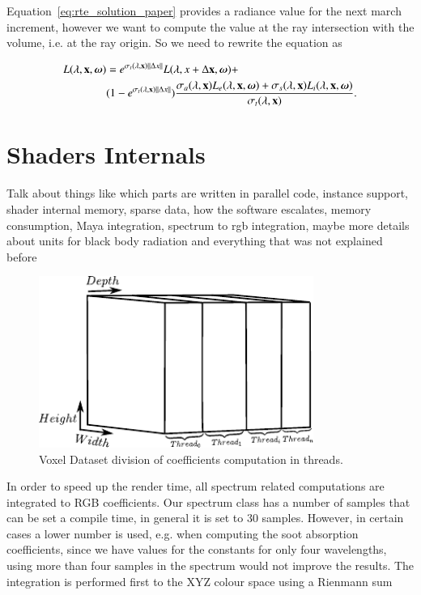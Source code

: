 Equation~\ref{eq:rte_solution_paper} provides a radiance value for the next march increment, however we want to compute the value at the ray intersection with the volume, i.e. at the ray origin.
So we need to rewrite the equation as

\begin{equation}
\label{eq:rte_solution_paper}
\begin{split}
L(\lambda, \mathbf{x}, \boldsymbol{\omega}) &= e^{\sigma_t(\lambda, \mathbf{x}) \left \| \Delta x \right \|} L(\lambda, x + \Delta\mathbf{x}, \boldsymbol{\omega}) +  \\
& (1 - e^{\sigma_t(\lambda, \mathbf{x}) \left \| \Delta x \right \|} ) \frac{\sigma_a(\lambda, \mathbf{x}) L_e(\lambda, \mathbf{x}, \boldsymbol{\omega}) + \sigma_s(\lambda, \mathbf{x}) L_i(\lambda, \mathbf{x}, \boldsymbol{\omega})}{\sigma_t(\lambda, \mathbf{x})}.
\end{split}
\end{equation}

\section{Shaders Internals}
\label{sec:shaders_internals}

Talk about things like which parts are written in parallel code, instance support, shader internal memory, sparse data, how the software escalates, memory consumption, Maya integration, spectrum to rgb integration, maybe more details about units for black body radiation and everything that was not explained before

\begin{figure}[htbp!]
\centering
\includegraphics[width=0.8\textwidth]{img/voxel_thread_division}
	\caption{Voxel Dataset division of coefficients computation in threads.}
	\label{fig:voxel_dataset_threaded}
\end{figure}

In order to speed up the render time, all spectrum related computations are integrated to RGB coefficients.
Our spectrum class has a number of samples that can be set a compile time, in general it is set to 30 samples.
However, in certain cases a lower number is used, e.g. when computing the soot absorption coefficients, since we have values for the constants for only four wavelengths, using more than four samples in the spectrum would not improve the results.
The integration is performed first to the XYZ colour space using a Rienmann sum

